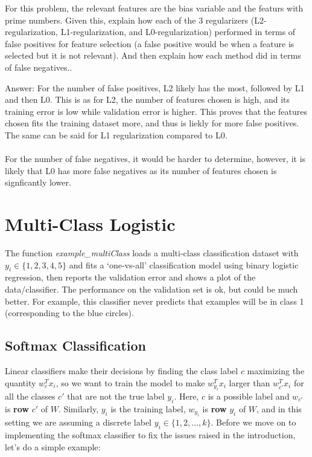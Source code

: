 \documentclass{article}
\def\ans#1{\par\gre{Answer: #1}}
\def\blu#1{{\color{blu}#1}}
\def\gre#1{{\color{gre}#1}}
\begin{document}
For this problem, the relevant features are the bias variable and the featurs with prime numbers. Given this, \blu{explain how each of the 3 regularizers (L2-regularization, L1-regularization, and L0-regularization) performed in terms of false positives for feature selection (a false positive would be when a feature is selected but it is not relevant). And then explain how each method did in terms of false negatives..}

\ans{For the number of false positives, L2 likely has the most, followed by L1 and then L0. This is as for L2, the number of features chosen is high, and its training error is low while validation error is higher. This proves that the features chosen fits the training dataset more, and thus is liekly for more false positives. The same can be said for L1 regularization compared to L0. \\
\\
For the number of false negatives, it would be harder to determine, however, it is likely that L0 has more false negatives as its number of features chosen is signficantly lower. }
\pagebreak


\section{Multi-Class Logistic}

The function \emph{example\_multiClass} loads a multi-class classification dataset with $y_i \in \{1,2,3,4,5\}$ and fits a `one-vs-all' classification model using binary logistic regression, then reports the validation error and shows a plot of the data/classifier. The performance on the validation set is ok, but could be much better. For example, this classifier never  predicts that examples will be in class 1 (corresponding to the blue circles).

\subsection{Softmax Classification}

Linear classifiers make their decisions by finding the class label $c$ maximizing the quantity $w_c^Tx_i$, so we want to train the model to make $w_{y_i}^Tx_i$ larger than $w_{c'}^Tx_i$ for all the classes $c'$ that are not the true label $y_i$.
Here, $c$ is a possible label and $w_{c'}$ is \textbf{row} $c'$ of $W$. Similarly, $y_i$ is the training label, $w_{y_i}$ is \textbf{row} $y_i$ of $W$, and in this setting we are assuming a discrete label $y_i \in \{1,2,\dots,k\}$. Before we move on to implementing the softmax classifier to fix the issues raised in the introduction, let's do a simple example:
\end{document}
